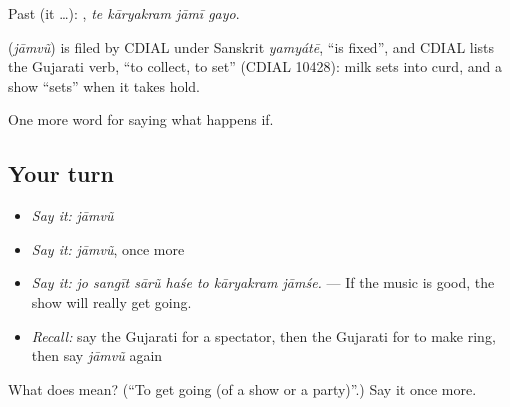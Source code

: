 Past (it …):    , \emph{te kāryakram jāmī gayo}.

\begin{cousinweb}
\textbf{} (\emph{jāmvũ}) is filed by CDIAL under Sanskrit \emph{yamyátē}, \textquotedblleft{}is fixed\textquotedblright{}, and CDIAL lists the Gujarati verb, \textquotedblleft{}to collect, to set\textquotedblright{} (CDIAL 10428): milk sets into curd, and a show \textquotedblleft{}sets\textquotedblright{} when it takes hold.
\end{cousinweb}

\begin{grammarlens}[title={What you've built}]
One more word for saying what happens if.
\end{grammarlens}

\subsection*{Your turn}
\begin{itemize}
\raggedright
  \item \emph{Say it:} \emph{jāmvũ}
  \item \emph{Say it:} \emph{jāmvũ}, once more
  \item \emph{Say it:} \emph{jo sangīt sārũ haśe to kāryakram jāmśe.} — If the music is good, the show will really get going.
  \item \emph{Recall:} say the Gujarati for a spectator, then the Gujarati for to make ring, then say \emph{jāmvũ} again
\end{itemize}

\begin{tcolorbox}[breakable,colback=teal!4,colframe=teal!35!black,title={Before you move on}]
What does  mean? (\textquotedblleft{}To get going (of a show or a party)\textquotedblright{}.) Say it once more.
\end{tcolorbox}
